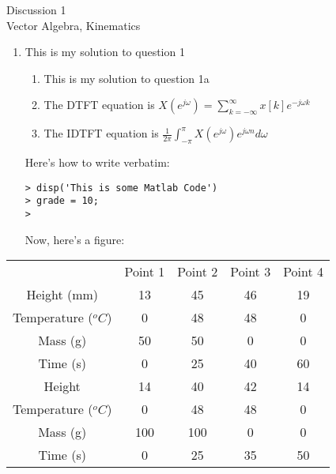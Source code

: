 \documentclass[12pt]{article}
\begin{document}
\pagestyle{pages}



\begin{center}
\vspace{3in}
{\Large Discussion 1 } \\[0.05in]
Vector Algebra, Kinematics \\ [0.5in]
\end{center}


\begin{enumerate}

\item This is my solution to question 1 
	\begin{enumerate} 
		\item This is my solution to question 1a
		\item The DTFT equation is $X(e^{j\omega}) =\sum_{k=-\infty}^\infty
			 x[k]e^{-j\omega k}$
		\item The IDTFT equation is $\frac{1}{2\pi}\int_{-\pi}^\pi
			 X(e^{j\omega})e^{j\omega n} d\omega$
	\end{enumerate}

\pagebreak 

Here's how to write verbatim:
\begin{verbatim}
> disp('This is some Matlab Code')
> grade = 10;
> 
\end{verbatim}

Now, here's a figure:
\begin{center}
\end{center}
\end{enumerate}

\pagebreak

\begin{table}[h]
\begin{tabular}{ccccc}
            & Point 1 & Point 2 & Point 3 & Point 4 \\
Height (mm) & 13      & 45      & 46      & 19      \\
Temperature ($^oC$) & 0       & 48      & 48      & 0       \\
Mass (g)        & 50     & 50     & 0      & 0      \\
Time (s)    & 0       & 25      & 40      & 60      \\
Height      & 14      & 40      & 42      & 14      \\
Temperature ($^oC$) & 0       & 48      & 48      & 0       \\
Mass (g)       & 100    & 100    & 0      & 0      \\
Time (s)    & 0       & 25      & 35      & 50      \\
\end{tabular}
\end{table}
\end{document}
